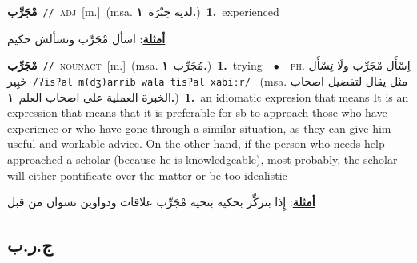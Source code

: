 \documentclass[10pt,a4paper,twoside]{article} %
\begin{document}
\begin{multicols}{2}
{\setlength\topsep{0pt}\textbf{\foreignlanguage{arabic}{مْجَرِّب}}\ {\color{gray}\texttt{//}\color{black}}\ \textsc{adj}\ [m.]\ \color{gray}(msa. \foreignlanguage{arabic}{لديه خِبْرَة}~\foreignlanguage{arabic}{\textbf{١.}})\color{black}\ \textbf{1.}~experienced\  \begin{flushright}\color{gray}\foreignlanguage{arabic}{\textbf{\underline{\foreignlanguage{arabic}{أمثلة}}}: اسأل مْجَرِّب وتسألش حكيم}\end{flushright}\color{black}} \vspace{2mm}

{\setlength\topsep{0pt}\textbf{\foreignlanguage{arabic}{مْجَرِّب}}\ {\color{gray}\texttt{//}\color{black}}\ \textsc{noun\textunderscore act}\ [m.]\ \color{gray}(msa. \foreignlanguage{arabic}{مُجَرِّب}~\foreignlanguage{arabic}{\textbf{١.}})\color{black}\ \textbf{1.}~trying\ \ $\bullet$\ \ \textsc{ph.} \color{gray} \foreignlanguage{arabic}{اِسْأَل مْجَرِّب ولَا تِسْأَل خَبِير}\color{black}\ {\color{gray}\texttt{/{\sffamily ʔisʔal m(dʒ)arrib wala tisʔal xabiːr}/}\color{black}}\ \color{gray} (msa. \foreignlanguage{arabic}{مثل يقال لتفضيل اصحاب الخبرة العملية على اصحاب العلم}~\foreignlanguage{arabic}{\textbf{١.}})\color{black}\ \textbf{1.}~an idiomatic expresion that means It is an expression that means that it is preferable for sb to approach those who have experience or who have gone through a similar situation, as they can give him useful and workable advice. On the other hand, if the person who needs help approached a scholar (because he is knowledgeable), most probably, the scholar will either pontificate over the matter or be too idealistic\  \begin{flushright}\color{gray}\foreignlanguage{arabic}{\textbf{\underline{\foreignlanguage{arabic}{أمثلة}}}: إِذا بتركِّز بحكيه بتحيه مْجَرِّب علاقات ودواوين نسوان من قبل}\end{flushright}\color{black}} \vspace{2mm}

\vspace{-3mm}
\subsection*{\color{blue}\foreignlanguage{arabic}{ج.ر.ب}\color{blue}{ (ntws)}} 


\end{multicols}
\end{document}
